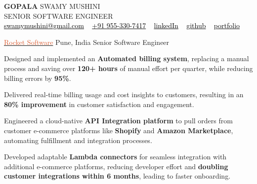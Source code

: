\documentclass[10pt]{article}
\begin{document}
\begin{flushleft}
    {\Huge  \textbf{GOPALA} SWAMY MUSHINI}\\[2.8ex]  %
    { SENIOR SOFTWARE ENGINEER}\\[2ex]  %

    \textcolor{db5c31}{\faEnvelope} \href{mailto:swamymushini@gmail.com}{\textcolor{black}{\large swamymushini@gmail.com}} 
    \hspace{1mm} \textbullet\ \hspace{1mm}
    \textcolor{db5c31}{\faPhone} \href{tel:+91-9553307417}{\textcolor{black}{\large +91 955-330-7417}} 
    \hspace{1mm} \textbullet\ \hspace{1mm}
    \textcolor{db5c31}{\faLinkedin} \href{https://www.linkedin.com/in/gopal-swamy-sde3/}{\textcolor{black}{\large linkedIn}} 
    \hspace{1mm} \textbullet\ \hspace{1mm}
    \textcolor{db5c31}{\faGithub} \href{https://github.com/swamymushini}{\textcolor{black}{\large github}} 
    \hspace{1mm} \textbullet\ \hspace{1mm}
    \textcolor{db5c31}{\faGlobe} \href{https://gopalaswamy.me}{\textcolor{black}{\large portfolio}} 

\end{flushleft}
\vspace{-2.4ex}

\headedsection
{\href{https://www.rocketsoftware.com/}{\textcolor{db5c31}{Rocket Software}}}
{Pune, India}
{Senior Software Engineer}
{}{
\vspace{-2.4ex}
\begin{circlist}
    \item Designed and implemented an {\textbf{Automated billing system}}, replacing a manual process and saving over \textbf{120+ hours} of manual effort per quarter, while reducing billing errors by \textbf{95\%}.
    \vspace{1mm}  
    \item Delivered real-time billing usage and cost insights to customers, resulting in an \textbf{80\% improvement} in customer satisfaction and engagement.
    \vspace{1mm}  
    \item Engineered a cloud-native \textbf{API Integration platform} to pull orders from customer e-commerce platforms like \textbf{Shopify} and \textbf{Amazon Marketplace}, automating fulfillment and integration processes.
    \vspace{1mm}  
    \item Developed adaptable \textbf{Lambda connectors} for seamless integration with additional e-commerce platforms, reducing developer effort and \textbf{doubling customer integrations within 6 months}, leading to faster onboarding.
    \vspace{1mm}
\end{circlist}
}
\end{document}
